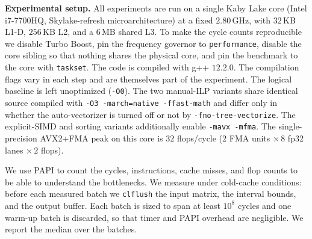 \documentclass[letterpaper]{article}
\newcommand{\mypar}[1]{{\bf #1.}}
\begin{document}
\mypar{Experimental setup}
All experiments are run on a single Kaby Lake core (Intel i7-7700HQ, Skylake-refresh microarchitecture) at a fixed $2.80$\,GHz, with $32$\,KB L1-D, $256$\,KB L2, and a $6$\,MB shared L3. To make the cycle counts reproducible we disable Turbo Boost, pin the frequency governor to \texttt{performance}, disable the core sibling so that nothing shares the physical core, and pin the benchmark to the core with \texttt{taskset}. The code is compiled with g++ $12.2.0$. The compilation flags vary in each step and are themselves part of the experiment. The logical baseline is left unoptimized (\texttt{-O0}). The two manual-ILP variants share identical source compiled with \texttt{-O3 -march=native -ffast-math} and differ only in whether the auto-vectorizer is turned off or not by \texttt{-fno-tree-vectorize}. The explicit-SIMD and sorting variants additionally enable \texttt{-mavx -mfma}. The single-precision AVX2+FMA peak on this core is $32$ flops/cycle ($2$ FMA units $\times\,8$ fp32 lanes $\times\,2$ flops).

We use PAPI \cite{papi} to count the cycles, instructions, cache misses, and flop counts to be able to understand the bottlenecks. We measure under cold-cache conditions: before each measured batch we \texttt{clflush} the input matrix, the interval bounds, and the output buffer. Each batch is sized to span at least $10^{8}$ cycles and one warm-up batch is discarded, so that timer and PAPI overhead are negligible. We report the median over the batches.
\end{document}
